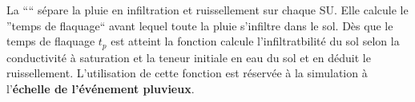 La ``\frenchname`` sépare la pluie en infiltration et ruissellement sur chaque SU. Elle calcule le ''temps de flaquage`` avant lequel toute la pluie s'infiltre dans le sol. Dès que le temps de flaquage $t_p$ est atteint la fonction calcule l'infiltratbilité du sol selon la conductivité à saturation et la teneur initiale en eau du sol et en déduit le ruissellement. L'utilisation de cette fonction est réservée à la simulation à l'\textbf{échelle de l'événement pluvieux}.
